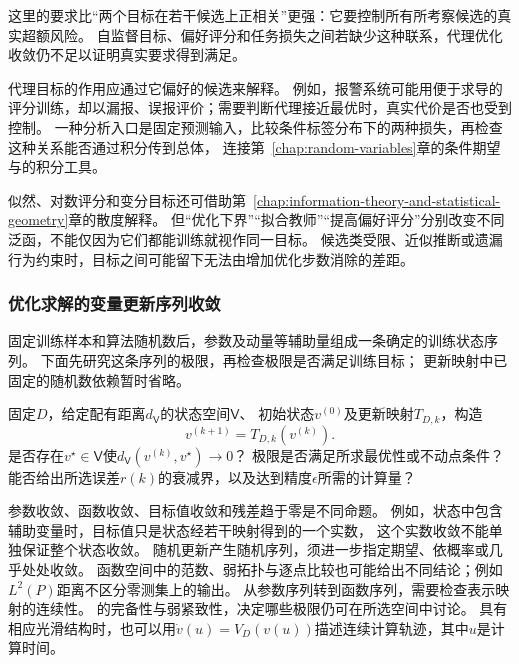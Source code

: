 这里的要求比“两个目标在若干候选上正相关”更强：它要控制所有所考察候选的真实超额风险。
自监督目标、偏好评分和任务损失之间若缺少这种联系，代理优化收敛仍不足以证明真实要求得到满足。

代理目标的作用应通过它偏好的候选来解释。
例如，报警系统可能用便于求导的评分训练，却以漏报、误报评价；需要判断代理接近最优时，真实代价是否也受到控制。
一种分析入口是固定预测输入，比较条件标签分布下的两种损失，再检查这种关系能否通过积分传到总体，
连接第~\ref{chap:random-variables}章的条件期望与的积分工具。

似然、对数评分和变分目标还可借助第~\ref{chap:information-theory-and-statistical-geometry}章的散度解释。
但“优化下界”“拟合教师”“提高偏好评分”分别改变不同泛函，不能仅因为它们都能训练就视作同一目标。
候选类受限、近似推断或遗漏行为约束时，目标之间可能留下无法由增加优化步数消除的差距。

\subsubsection{优化求解的变量更新序列收敛}
\label{sec:future-analysis-convergence}

固定训练样本和算法随机数后，参数及动量等辅助量组成一条确定的训练状态序列。
下面先研究这条序列的极限，再检查极限是否满足训练目标；
更新映射中已固定的随机数依赖暂时省略。

\begin{mathproblem}[训练序列的极限与速度]
  \label{question:future-convergence}
  固定$D$，给定配有距离$d_{\mathsf V}$的状态空间$\mathsf V$、
  初始状态$v^{(0)}$及更新映射$T_{D,k}$，构造
  \[
    v^{(k+1)}=T_{D,k}(v^{(k)}).
  \]
  是否存在$v^\star\in\mathsf V$使$d_{\mathsf V}(v^{(k)},v^\star)\to0$？
  极限是否满足所求最优性或不动点条件？
  能否给出所选误差$r(k)$的衰减界，以及达到精度$\epsilon$所需的计算量？
\end{mathproblem}

参数收敛、函数收敛、目标值收敛和残差趋于零是不同命题。
例如，状态中包含辅助变量时，目标值只是状态经若干映射得到的一个实数，
这个实数收敛不能单独保证整个状态收敛。
随机更新产生随机序列，须进一步指定期望、依概率或几乎处处收敛。
函数空间中的范数、弱拓扑与逐点比较也可能给出不同结论；例如$L^2(P)$距离不区分零测集上的输出。
从参数序列转到函数序列，需要检查表示映射的连续性。
的完备性与弱紧致性，决定哪些极限仍可在所选空间中讨论。
具有相应光滑结构时，也可以用$\dot v(u)=V_D(v(u))$描述连续计算轨迹，其中$u$是计算时间。

